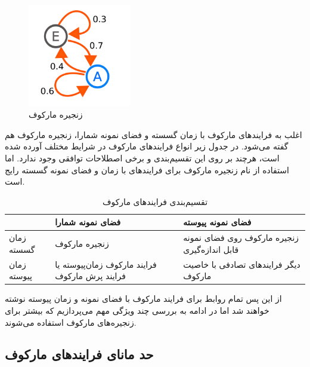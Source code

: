 \begin{figure}[H]
  \centering
  \includegraphics[width=0.4\textwidth]{images/weather_chain.pdf}
  \caption{زنجیره مارکوف} \label{fig:weather_chain}
  \par\medskip
\captionsetup{justification=centering}
\end{figure}
\FloatBarrier

اغلب به فرایندهای مارکوف با زمان گسسته و فضای نمونه شمارا، زنجیره مارکوف هم گفته می‌شود. در جدول زیر انواع فرایندهای مارکوف در شرایط مختلف آورده شده است، هرچند بر روی این تقسیم‌بندی و برخی اصطلاحات توافقی وجود ندارد. اما استفاده از نام زنجیره مارکوف برای فرایندهای با زمان و فضای نمونه گسسته رایج است.\cite{gagniuc_markov_2017}
\begin{table}[htb]
  \centering
  \caption{تقسیم‌بندی فرایندهای مارکوف}
  \begin{tabular}{|C{4cm}|C{4cm}|C{4cm}|}
    \hline
     & فضای نمونه شمارا                               & فضای نمونه پیوسته                             \\ \hline
    زمان گسسته               & زنجیره مارکوف                                  & زنجیره مارکوف روی فضای نمونه قابل اندازه‌گیری \\ \hline
    زمان پیوسته              & فرایند مارکوف زمان‌پیوسته یا فرایند پرش مارکوف & دیگر فرایندهای تصادفی با خاصیت مارکوف         \\ \hline
    \end{tabular}
\end{table}
\FloatBarrier

از این پس تمام روابط برای فرایند مارکوف با فضای نمونه و زمان پیوسته نوشته خواهند شد اما در ادامه به بررسی چند ویژگی مهم می‌پردازیم که بیشتر برای زنجیره‌های مارکوف استفاده می‌شوند.

\subsection{حد مانای فرایندهای مارکوف}

